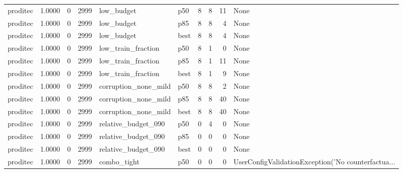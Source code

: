 \begin{tabular}{lrrrllrrrl}
proditec &    1.0000 &    0 &   2999 &           low\_budget &    p50 &               8 &          8 &      11 &                                               None \\
proditec &    1.0000 &    0 &   2999 &           low\_budget &    p85 &               8 &          8 &       4 &                                               None \\
proditec &    1.0000 &    0 &   2999 &           low\_budget &   best &               8 &          8 &       4 &                                               None \\
proditec &    1.0000 &    0 &   2999 &   low\_train\_fraction &    p50 &               8 &          1 &       0 &                                               None \\
proditec &    1.0000 &    0 &   2999 &   low\_train\_fraction &    p85 &               8 &          1 &      11 &                                               None \\
proditec &    1.0000 &    0 &   2999 &   low\_train\_fraction &   best &               8 &          1 &       9 &                                               None \\
proditec &    1.0000 &    0 &   2999 & corruption\_none\_mild &    p50 &               8 &          8 &       2 &                                               None \\
proditec &    1.0000 &    0 &   2999 & corruption\_none\_mild &    p85 &               8 &          8 &      40 &                                               None \\
proditec &    1.0000 &    0 &   2999 & corruption\_none\_mild &   best &               8 &          8 &      40 &                                               None \\
proditec &    1.0000 &    0 &   2999 &  relative\_budget\_090 &    p50 &               0 &          4 &       0 &                                               None \\
proditec &    1.0000 &    0 &   2999 &  relative\_budget\_090 &    p85 &               0 &          0 &       0 &                                               None \\
proditec &    1.0000 &    0 &   2999 &  relative\_budget\_090 &   best &               0 &          0 &       0 &                                               None \\
proditec &    1.0000 &    0 &   2999 &          combo\_tight &    p50 &               0 &          0 &       0 & UserConfigValidationException('No counterfactua... \\

\end{tabular}

